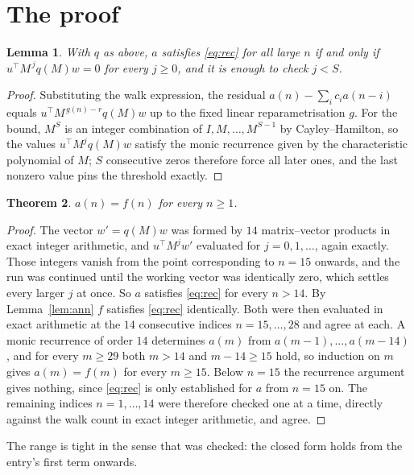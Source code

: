 \documentclass[11pt,a4paper]{article}
\theoremstyle{plain}
\newtheorem{theorem}{Theorem}
\newtheorem{lemma}[theorem]{Lemma}
\theoremstyle{definition}
\begin{document}
\section{The proof}

\begin{lemma}\label{lem:crit}
With $q$ as above, $a$ satisfies \eqref{eq:rec} for all large $n$ if and only if
$u^{\!\top}M^{\,j}q(M)w=0$ for every $j\ge0$, and it is enough to check $j<S$.
\end{lemma}

\begin{proof}
Substituting the walk expression, the residual $a(n)-\sum_ic_ia(n-i)$ equals
$u^{\!\top}M^{\,g(n)-r}q(M)w$ up to the fixed linear reparametrisation $g$. For the bound,
$M^{S}$ is an integer combination of $I,M,\dots,M^{S-1}$ by Cayley--Hamilton, so the values
$u^{\!\top}M^{j}q(M)w$ satisfy the monic recurrence given by the characteristic polynomial of
$M$; $S$ consecutive zeros therefore force all later ones, and the last nonzero value pins the
threshold exactly.
\end{proof}

\begin{theorem}
$a(n)=f(n)$ for every $n\ge1$.
\end{theorem}

\begin{proof}
The vector $w'=q(M)w$ was formed by $14$ matrix--vector products in exact integer
arithmetic, and $u^{\!\top}M^{j}w'$ evaluated for $j=0,1,\dots$, again exactly. Those integers
vanish from the point corresponding to $n=15$ onwards, and the run was continued until the
working vector was identically zero, which settles every larger $j$ at once. So $a$ satisfies
\eqref{eq:rec} for every $n>14$. By Lemma~\ref{lem:ann} $f$ satisfies \eqref{eq:rec}
identically. Both were then evaluated in exact arithmetic at the $14$ consecutive indices
$n=15,\dots,28$ and agree at each. A monic recurrence of order $14$
determines $a(m)$ from $a(m-1),\dots,a(m-14)$, and for every $m\ge29$ both
$m>14$ and $m-14\ge15$ hold, so induction on $m$ gives $a(m)=f(m)$ for every
$m\ge15$.
Below $n=15$ the recurrence argument gives nothing, since \eqref{eq:rec} is only
established for $a$ from $n=15$ on. The remaining indices $n=1,\dots,14$ were
therefore checked one at a time, directly against the walk count in exact integer arithmetic,
and agree.
\end{proof}

The range is tight in the sense that was checked: the closed form holds from the entry's first term onwards.
\end{document}
